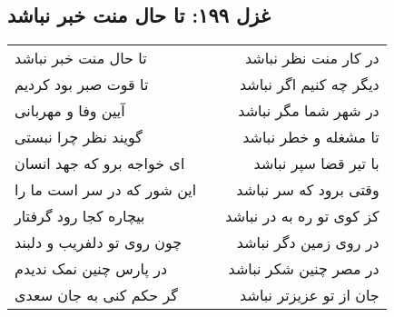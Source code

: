 \begin{center}
\section*{غزل ۱۹۹: تا حال منت خبر نباشد}
\label{sec:199}
\begin{longtable}{l p{0.5cm} r}
تا حال منت خبر نباشد
&&
در کار منت نظر نباشد
\\
تا قوت صبر بود کردیم
&&
دیگر چه کنیم اگر نباشد
\\
آیین وفا و مهربانی
&&
در شهر شما مگر نباشد
\\
گویند نظر چرا نبستی
&&
تا مشغله و خطر نباشد
\\
ای خواجه برو که جهد انسان
&&
با تیر قضا سپر نباشد
\\
این شور که در سر است ما را
&&
وقتی برود که سر نباشد
\\
بیچاره کجا رود گرفتار
&&
کز کوی تو ره به در نباشد
\\
چون روی تو دلفریب و دلبند
&&
در روی زمین دگر نباشد
\\
در پارس چنین نمک ندیدم
&&
در مصر چنین شکر نباشد
\\
گر حکم کنی به جان سعدی
&&
جان از تو عزیزتر نباشد
\\
\end{longtable}
\end{center}
